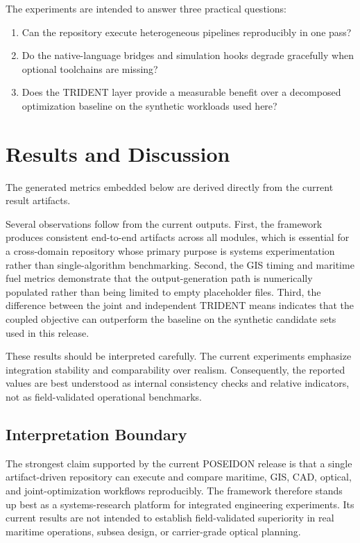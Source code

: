 \documentclass[conference]{IEEEtran}
\begin{document}
The experiments are intended to answer three practical questions:
\begin{enumerate}
\item Can the repository execute heterogeneous pipelines reproducibly in one pass?
\item Do the native-language bridges and simulation hooks degrade gracefully when optional toolchains are missing?
\item Does the TRIDENT layer provide a measurable benefit over a decomposed optimization baseline on the synthetic workloads used here?
\end{enumerate}

\section{Results and Discussion}
The generated metrics embedded below are derived directly from the current result artifacts.


Several observations follow from the current outputs. First, the framework produces consistent end-to-end artifacts across all modules, which is essential for a cross-domain repository whose primary purpose is systems experimentation rather than single-algorithm benchmarking. Second, the GIS timing and maritime fuel metrics demonstrate that the output-generation path is numerically populated rather than being limited to empty placeholder files. Third, the difference between the joint and independent TRIDENT means indicates that the coupled objective can outperform the baseline on the synthetic candidate sets used in this release.

These results should be interpreted carefully. The current experiments emphasize integration stability and comparability over realism. Consequently, the reported values are best understood as internal consistency checks and relative indicators, not as field-validated operational benchmarks.

\subsection{Interpretation Boundary}
The strongest claim supported by the current POSEIDON release is that a single
artifact-driven repository can execute and compare maritime, GIS, CAD, optical,
and joint-optimization workflows reproducibly. The framework therefore stands
up best as a systems-research platform for integrated engineering experiments.
Its current results are not intended to establish field-validated superiority in
real maritime operations, subsea design, or carrier-grade optical planning.
\end{document}
